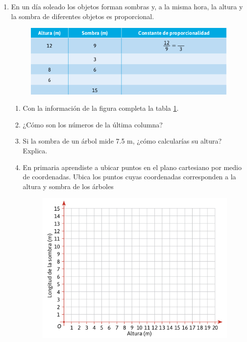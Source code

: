 \documentclass[11pt]{book}
\begin{document}
\begin{minipage}[t]{0.75\textwidth}
  \begin{enumerate}
    \item En un día soleado los objetos forman sombras y, a la misma hora, la altura y la
          sombra de diferentes objetos es proporcional.
          \begin{figure}[H]
            \centering
            \includegraphics[width=0.8\linewidth]{tabla_sombras.png}
            \label{tab:tabla_sombras}
          \end{figure}

          \begin{enumerate}
            \item Con la información de la figura completa la tabla \ref{tab:tabla_sombras}.
            \item ¿Cómo son los números de la última columna?
            \item Si la sombra de un árbol mide 7.5 m, ¿cómo calcularías su altura? Explica.
            \item  En primaria aprendiste a ubicar puntos en el plano cartesiano por medio de
                  coordenadas. Ubica los puntos cuyas coordenadas corresponden a la altura y sombra de los árboles
                  \begin{figure}[H]
                    \centering
                    \includegraphics[width=\linewidth]{plano_sombras.png}
                  \end{figure}

          \end{enumerate}
  \end{enumerate}
\end{minipage}
\end{document}
